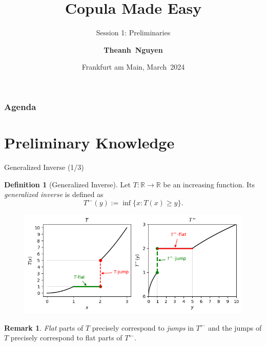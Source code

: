 \documentclass[envcountsect]{beamer}
\title[\textcolor{white}{FRED-Talk}]{\textbf{\Large Copula Made Easy}}
\subtitle{Session 1: Preliminaries}
\author[T.~Nguyen]{\small{\bf Theanh~Nguyen}}
\date[\tiny{Frankfurt a.~M., 2024}]{\small Frankfurt am Main, March~2024}
\newcommand{\bR}{\mathbb{R}}
\theoremstyle{definition}
\newtheorem{df}{Definition}[section]
\newtheorem*{rem}{Remark}
\theoremstyle{plain}
\newcommand*{\geninv}[1]{#1^{\leftarrow}}
\begin{document}
\begin{frame}
\titlepage
\end{frame}
\begin{frame}
\frametitle{Agenda}
\tableofcontents
\end{frame}
\section{Preliminary Knowledge}
\begin{frame}
\tableofcontents[currentsection]
\end{frame}
\begin{frame}{Generalized Inverse (1/3)}
	\begin{df}[Generalized Inverse]
		Let $T: \bR \rightarrow \bR $ be an increasing function. Its {\it generalized inverse} is defined as 
		\begin{equation}
			\geninv{T}(y) := \inf\{x: T(x) \ge y\}.
		\end{equation}
	\end{df}

\begin{figure}[]
	\label{fig:geninv}
	\centering
	\includegraphics[scale=0.45]{figs/gen_inv.png}
\end{figure}
\begin{rem}
{\it Flat} parts of $T$ precisely correspond to {\it jumps} in $\geninv{T}$ and the jumps of $T$ precisely correspond to flat parts of  $\geninv{T}$.	
\end{rem}
\end{frame}
\end{document}
